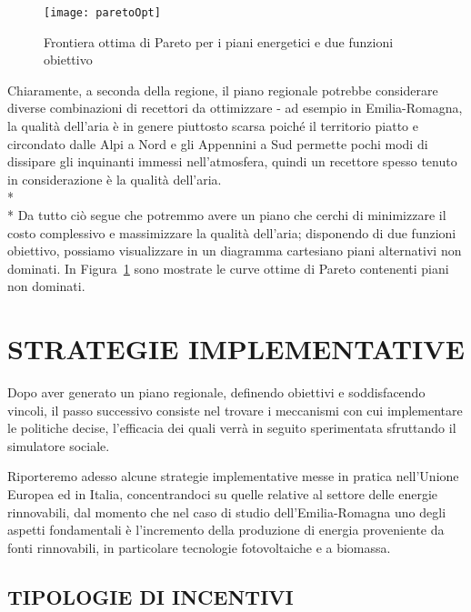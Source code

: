 \documentclass[12pt,a4paper,openright,twoside]{report}
\begin{document}
\begin{figure}[H]
	\centering
	\texttt{[image: paretoOpt]}
	\caption{Frontiera ottima di Pareto per i piani energetici e due funzioni obiettivo}
	\label{paretoOpt}
\end{figure}

Chiaramente, a seconda della regione, il piano regionale potrebbe considerare diverse combinazioni di recettori da ottimizzare - ad esempio in Emilia-Romagna, la qualità dell'aria è in genere piuttosto scarsa poiché il territorio piatto e circondato dalle Alpi a Nord e gli Appennini a Sud permette pochi modi di dissipare gli inquinanti immessi nell'atmosfera, quindi un recettore spesso tenuto in considerazione è la qualità dell'aria.\\*\\*
Da tutto ciò segue che potremmo avere un piano che cerchi di minimizzare il costo complessivo e massimizzare la qualità dell'aria; disponendo di due funzioni obiettivo, possiamo visualizzare in un diagramma cartesiano piani alternativi non dominati. In Figura~\ref{paretoOpt} sono mostrate le curve ottime di Pareto contenenti piani non dominati.

\section{\nohyphens{STRATEGIE IMPLEMENTATIVE}}
Dopo aver generato un piano regionale, definendo obiettivi e soddisfacendo vincoli, il passo successivo consiste nel trovare i meccanismi con cui implementare le politiche decise, l'efficacia dei quali verrà in seguito sperimentata sfruttando il simulatore sociale.

Riporteremo adesso alcune strategie implementative messe in pratica nell'Unione Europea ed in Italia, concentrandoci su quelle relative al settore delle energie rinnovabili, dal momento che nel caso di studio dell'Emilia-Romagna uno degli aspetti fondamentali è l'incremento della produzione di energia proveniente da fonti rinnovabili, in particolare tecnologie fotovoltaiche e a biomassa.

\subsection[INCENTIVI]{\nohyphens{TIPOLOGIE DI INCENTIVI}}
\end{document}

